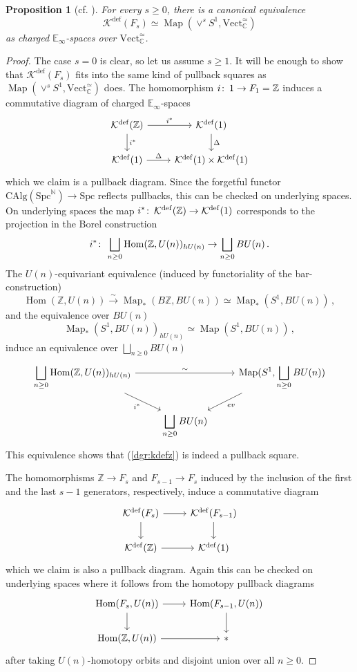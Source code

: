 \documentclass[oneside, a4paper, 12pt]{article}
\numberwithin{equation}{section}
\DeclareMathOperator{\Hom}{Hom}
\newcommand{\Kdef}{\mathcal{K}^{\mathrm{def}}}
\newcommand{\CAlg}{\mathrm{CAlg}}
\newcommand{\Spc}{\mathrm{Spc}}
\newcommand{\Z}{\mathbb{Z}}
\newcommand{\C}{\mathbb{C}}
\newcommand{\N}{\mathbb{N}}
\newcommand{\Vect}{\mathrm{Vect}}
\newcommand{\Map}{\operatorname{Map}}
\newcommand{\co}{\colon\thinspace}
\theoremstyle{plain}
\newtheorem{proposition}[theorem]{Proposition}
\theoremstyle{definition}
\theoremstyle{remark}
\begin{document}
\begin{proposition}[{cf. \cite[Section 5]{LBott}}] \label{prop:identificationkdef}
For every $s\geq 0$, there is a canonical equivalence
\[
\Kdef(F_s) \simeq \Map(\vee^s S^1,\mathrm{Vect}_{\C}^\simeq)
\]
as charged $\mathbb{E}_\infty$-spaces over $\Vect_{\C}^\simeq$.
\end{proposition}
\begin{proof}
The case $s=0$ is clear, so let us assume $s\geq 1$. It will be enough to show that $\Kdef(F_s)$ fits into the same kind of pullback squares as $\Map(\vee^s S^1,\Vect_{\C}^{\simeq})$ does. The homomorphism $i\co 1\to F_1=\Z$ induces a commutative diagram of charged $\mathbb{E}_\infty$-spaces
\begin{equation} \label{dgr:kdefz}
\begin{tikzcd}
\Kdef(\Z) \arrow[r, "i^\ast"] \arrow[d, "i^\ast"] & \Kdef(1) \arrow[d, "\Delta"] \\
\Kdef(1) \arrow[r, "\Delta"] & \Kdef(1) \times \Kdef(1)
\end{tikzcd}
\end{equation}
which we claim is a pullback diagram. Since the forgetful functor $\CAlg(\Spc^\N)\to \Spc$ reflects pullbacks, this can be checked on underlying spaces. On underlying spaces the map $i^\ast \co \Kdef(\Z)\to \Kdef(1)$ corresponds to the projection in the Borel construction
\[
i^\ast \co \bigsqcup_{n\geq 0} \Hom(\Z,U(n))_{hU(n)} \to \bigsqcup_{n\geq 0} BU(n)\, .
\]
The $U(n)$-equivariant equivalence (induced by functoriality of the bar-construction)
\[
\Hom(\Z,U(n))\xrightarrow{\sim} \Map_\ast(B\Z,BU(n))\simeq \Map_\ast(S^1,BU(n))\,,
\]
and the equivalence over $BU(n)$
\[
\Map_\ast(S^1,BU(n))_{hU(n)} \simeq \Map(S^1,BU(n))\,,
\]
induce an equivalence over $\bigsqcup_{n\geq 0} BU(n)$
\[
\begin{tikzcd}
{\displaystyle \bigsqcup_{n\geq 0} \Hom(\Z,U(n))_{hU(n)}} \arrow[rr, "\sim"] \arrow[dr, "i^\ast" swap] & & {\displaystyle \Map(S^1, \bigsqcup_{n\geq 0} BU(n))} \arrow[dl, "ev"] \\
& {\displaystyle \bigsqcup_{n\geq 0}BU(n)} &
\end{tikzcd}
\]
This equivalence shows that (\ref{dgr:kdefz}) is indeed a pullback square.

The homomorphisms $\Z\to F_s$ and $F_{s-1}\to F_s$ induced by the inclusion of the first and the last $s-1$ generators, respectively, induce a commutative diagram
\[
\begin{tikzcd}
\Kdef(F_s) \arrow[r] \arrow[d] & \Kdef(F_{s-1}) \arrow[d] \\
\Kdef(\Z)\arrow[r] &  \Kdef(1)
\end{tikzcd}
\]
which we claim is also a pullback diagram. Again this can be checked on underlying spaces where it follows from the homotopy pullback diagrams
\[
\begin{tikzcd}
\Hom(F_s,U(n)) \arrow[r] \arrow[d] & \Hom(F_{s-1},U(n)) \arrow[d] \\
\Hom(\Z,U(n)) \arrow[r] & \ast 
\end{tikzcd}
\]
after taking $U(n)$-homotopy orbits and disjoint union over all $n\geq 0$.
\end{proof}
\end{document}
